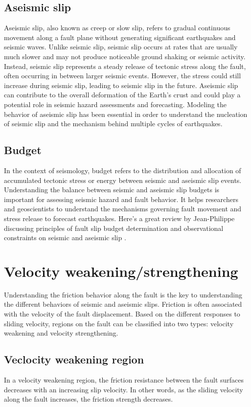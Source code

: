 \subsection{Aseismic slip}
Aseismic slip, also known as creep or slow slip, refers to gradual continuous movement along a fault plane without generating significant earthquakes and seismic waves.
Unlike seismic slip, seismic slip occurs at rates that are usually much slower and may not produce noticeable ground shaking or seismic activity.
Instead, seismic slip represents a steady release of tectonic stress along the fault, often occurring in between larger seismic events.
However, the stress could still increase during seismic slip, leading to seismic slip in the future.
Aseismic slip can contribute to the overall deformation of the Earth's crust and could play a potential role in seismic hazard assessments and forecasting.
Modeling the behavior of aseismic slip has been essential in order to understand the nucleation of seismic slip and the mechanism behind multiple cycles of earthquakes.

\subsection{Budget}
In the context of seismology, budget refers to the distribution and allocation of accumulated tectonic stress or energy between seismic and aseismic slip events.
Understanding the balance between seismic and aseismic slip budgets is important for assessing seismic hazard and fault behavior.
It helps researchers and geoscientists to understand the mechanisms governing fault movement and stress release to forecast earthquakes. Here's a great review by Jean-Philippe discussing principles of fault slip budget determination and observational constraints on seismic and aseismic slip \cite{annurev:/content/journals/10.1146/annurev-earth-060614-105302}.


\section{Velocity weakening/strengthening}
Understanding the friction behavior along the fault is the key to understanding the different behaviors of seismic and aseismic slips.
Friction is often associated with the velocity of the fault displacement.
Based on the different responses to sliding velocity, regions on the fault can be classified into two types: velocity weakening and velocity strengthening.
\subsection{Veclocity weakening region}
In a velocity weakening region, the friction resistance between the fault surfaces decreases with an increasing slip velocity.
In other words, as the sliding velocity along the fault increases, the friction strength decreases.

